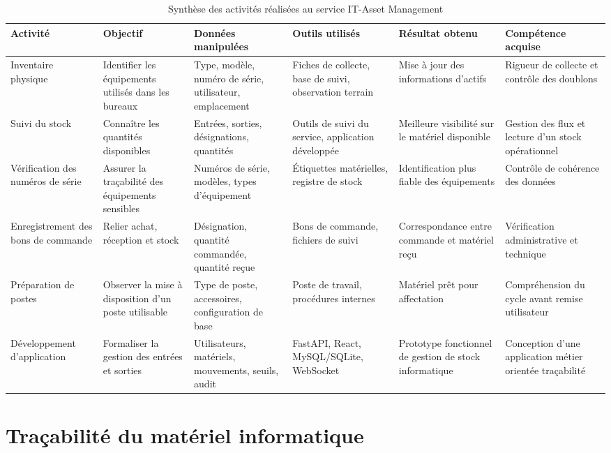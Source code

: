 \documentclass[12pt,a4paper]{report}
\begin{document}
\begin{table}[h!]
\centering
\caption{Synthèse des activités réalisées au service IT-Asset Management}
\begin{adjustbox}{width=\textwidth}
\begin{tabular}{p{3.1cm}p{3.5cm}p{3.8cm}p{3.2cm}p{3.6cm}p{3.4cm}}
\toprule
Activité & Objectif & Données manipulées & Outils utilisés & Résultat obtenu & Compétence acquise \\
\midrule
Inventaire physique & Identifier les équipements utilisés dans les bureaux & Type, modèle, numéro de série, utilisateur, emplacement & Fiches de collecte, base de suivi, observation terrain & Mise à jour des informations d'actifs & Rigueur de collecte et contrôle des doublons \\
Suivi du stock & Connaître les quantités disponibles & Entrées, sorties, désignations, quantités & Outils de suivi du service, application développée & Meilleure visibilité sur le matériel disponible & Gestion des flux et lecture d'un stock opérationnel \\
Vérification des numéros de série & Assurer la traçabilité des équipements sensibles & Numéros de série, modèles, types d'équipement & Étiquettes matérielles, registre de stock & Identification plus fiable des équipements & Contrôle de cohérence des données \\
Enregistrement des bons de commande & Relier achat, réception et stock & Désignation, quantité commandée, quantité reçue & Bons de commande, fichiers de suivi & Correspondance entre commande et matériel reçu & Vérification administrative et technique \\
Préparation de postes & Observer la mise à disposition d'un poste utilisable & Type de poste, accessoires, configuration de base & Poste de travail, procédures internes & Matériel prêt pour affectation & Compréhension du cycle avant remise utilisateur \\
Développement d'application & Formaliser la gestion des entrées et sorties & Utilisateurs, matériels, mouvements, seuils, audit & FastAPI, React, MySQL/SQLite, WebSocket & Prototype fonctionnel de gestion de stock informatique & Conception d'une application métier orientée traçabilité \\
\bottomrule
\end{tabular}
\end{adjustbox}
\end{table}

\section{Traçabilité du matériel informatique}
\end{document}
